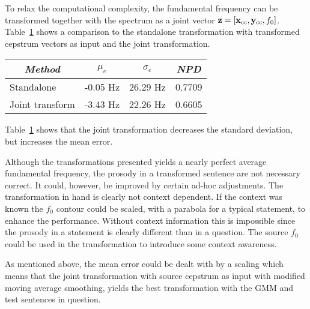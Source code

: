 To relax the computational complexity, the fundamental frequency can be transformed together with the spectrum as a joint vector $\mathbf{z} = \left[\mathbf{x}_{cc},\mathbf{y}_{cc},f_0\right]$. Table~\ref{tab:f0_joint_transform} shows a comparison to the standalone transformation with transformed cepstrum vectors as input and the joint transformation.
\begin{table}[htbp]
	\begin{center}
		\label{tab:f0_joint_transform}
		\begin{tabular}{lrrr}
			\toprule
			\multicolumn{1}{c}{\emph{Method}} & \multicolumn{1}{c}{\emph{$\mu_e$}} & \multicolumn{1}{c}{\emph{$\sigma_e$}} & \multicolumn{1}{c}{\emph{NPD}}\\
			\midrule
			Standalone & -0.05 Hz & 26.29 Hz & 0.7709\\
			Joint transform & -3.43 Hz & 22.26 Hz & 0.6605\\
			\bottomrule			
		\end{tabular}		
	\end{center}	
\end{table}
Table~\ref{tab:f0_joint_transform} shows that the joint transformation decreases the standard deviation, but increases the mean error. 

Although the transformations presented yields a nearly perfect average fundamental frequency, the prosody in a transformed sentence are not necessary correct. It could, however, be improved by certain ad-hoc adjustments. The transformation in hand is clearly not context dependent. If the context was known the $f_0$ contour could be scaled, with \eg a parabola for a typical statement, to enhance the performance. Without context information this is impossible since the prosody in a statement is clearly different than in a question. The source $f_0$ could be used in the transformation to introduce some context awareness. 

As mentioned above, the mean error could be dealt with by a scaling which means that the joint transformation with source cepstrum as input with modified moving average smoothing, yields the best transformation with the GMM and test sentences in question.

